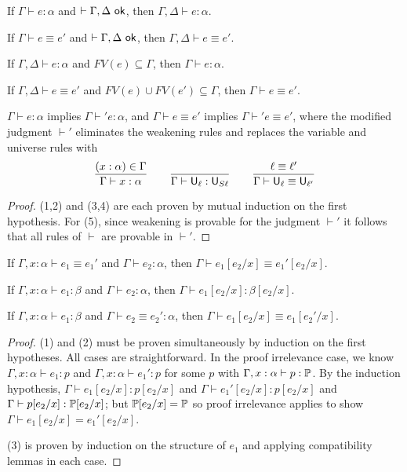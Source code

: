 \begin{lemma}[Weakening]\label{thm:weak}
\begin{thmlist}
\item If $\Gamma\vdash e:\alpha$ and $\vdash\Gamma,\Delta\ok$, then $\Gamma,\Delta\vdash e:\alpha$.
\item If $\Gamma\vdash e\equiv e'$ and $\vdash\Gamma,\Delta\ok$, then $\Gamma,\Delta\vdash e\equiv e'$.
\item If $\Gamma,\Delta\vdash e:\alpha$ and $FV(e)\subseteq\Gamma$, then $\Gamma\vdash e:\alpha$.
\item If $\Gamma,\Delta\vdash e\equiv e'$ and $FV(e)\cup FV(e')\subseteq\Gamma$, then $\Gamma\vdash e\equiv e'$.
\item $\Gamma\vdash e:\alpha$ implies $\Gamma\vdash' e:\alpha$, and $\Gamma\vdash e\equiv e'$ implies $\Gamma\vdash' e\equiv e'$, where the modified judgment $\vdash'$ eliminates the weakening rules and replaces the variable and universe rules with
$$\frac{(x:\alpha)\in\Gamma}{\Gamma\vdash x:\alpha}\qquad\frac{}{\Gamma\vdash \U_\ell:\U_{S\ell}}\qquad\frac{\ell\equiv\ell'}{\Gamma\vdash \U_\ell\equiv\U_{\ell'}}$$
\end{thmlist}
\end{lemma}
\begin{proof}
(1,2) and (3,4) are each proven by mutual induction on the first hypothesis. For (5), since weakening is provable for the judgment $\vdash'$ it follows that all rules of $\vdash$ are provable in $\vdash'$.
\end{proof}

\begin{lemma}\label{thm:subst}
\begin{thmlist}
\item If $\Gamma,x:\alpha\vdash e_1\equiv e_1'$ and $\Gamma\vdash e_2:\alpha$, then $\Gamma\vdash e_1[e_2/x]\equiv e_1'[e_2/x]$.
\item\label{item:subst_ty} If $\Gamma,x:\alpha\vdash e_1:\beta$ and $\Gamma\vdash e_2:\alpha$, then $\Gamma\vdash e_1[e_2/x]:\beta[e_2/x]$.
\item If $\Gamma,x:\alpha\vdash e_1:\beta$ and $\Gamma\vdash e_2\equiv e_2':\alpha$, then $\Gamma\vdash e_1[e_2/x]\equiv e_1[e_2'/x]$.
\end{thmlist}
\end{lemma}
\begin{proof} (1) and (2) must be proven simultaneously by induction on the first hypotheses. All cases are straightforward. In the proof irrelevance case, we know $\Gamma,x:\alpha\vdash e_1:p$ and $\Gamma,x:\alpha\vdash e_1':p$ for some $p$ with $\Gamma,x:\alpha\vdash p:\P$. By the induction hypothesis, $\Gamma\vdash e_1[e_2/x]:p[e_2/x]$ and $\Gamma\vdash e_1'[e_2/x]:p[e_2/x]$ and $\Gamma\vdash p[e_2/x]:\P[e_2/x]$; but $\P[e_2/x]=\P$ so proof irrelevance applies to show $\Gamma\vdash e_1[e_2/x]=e_1'[e_2/x]$.

(3) is proven by induction on the structure of $e_1$ and applying compatibility lemmas in each case.
\end{proof}

